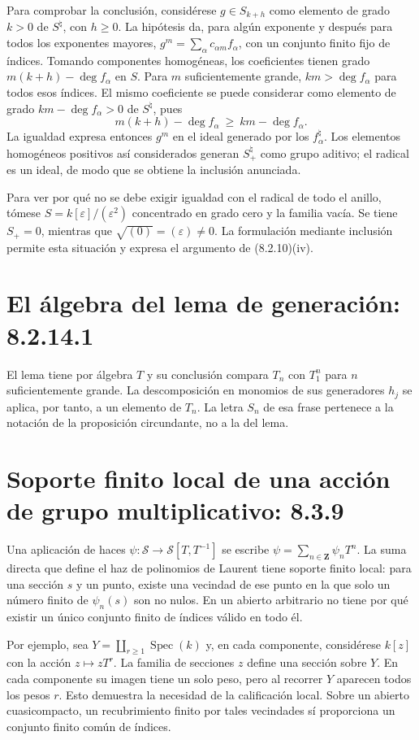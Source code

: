 \documentclass[11pt,a4paper]{article}
\DeclareMathOperator{\Spec}{Spec}
\begin{document}
Para comprobar la conclusión, considérese $g\in S_{k+h}$ como
elemento de grado $k>0$ de $S^\natural$, con $h\geq0$.
La hipótesis da, para algún exponente y después para todos los
exponentes mayores,
$g^m=\sum_\alpha c_{\alpha m}f_\alpha$, con un conjunto finito
fijo de índices. Tomando componentes homogéneas, los coeficientes
tienen grado $m(k+h)-\deg f_\alpha$ en $S$.
Para $m$ suficientemente grande, $km>\deg f_\alpha$ para todos
esos índices. El mismo coeficiente se puede considerar como
elemento de grado $km-\deg f_\alpha>0$ de $S^\natural$, pues
\[
m(k+h)-\deg f_\alpha\ \geq\ km-\deg f_\alpha.
\]
La igualdad expresa entonces $g^m$ en el ideal generado por los
$f^\natural_\alpha$. Los elementos homogéneos positivos así
considerados generan $S^\natural_+$ como grupo aditivo; el radical
es un ideal, de modo que se obtiene la inclusión anunciada.

Para ver por qué no se debe exigir igualdad con el radical de todo
el anillo, tómese $S=k[\varepsilon]/(\varepsilon^2)$ concentrado
en grado cero y la familia vacía. Se tiene $S_+=0$, mientras que
$\sqrt{(0)}=(\varepsilon)\ne0$. La formulación mediante inclusión
permite esta situación y expresa el argumento de (8.2.10)(iv).

\section{El álgebra del lema de generación: 8.2.14.1}
El lema tiene por álgebra $T$ y su conclusión compara $T_n$ con
$T_1^n$ para $n$ suficientemente grande. La descomposición en
monomios de sus generadores $h_j$ se aplica, por tanto, a un
elemento de $T_n$. La letra $S_n$ de esa frase pertenece a la
notación de la proposición circundante, no a la del lema.

\section{Soporte finito local de una acción de grupo multiplicativo: 8.3.9}
Una aplicación de haces
$\psi:\mathcal S\to\mathcal S[T,T^{-1}]$ se escribe
$\psi=\sum_{n\in\mathbf Z}\psi_nT^n$.
La suma directa que define el haz de polinomios de Laurent tiene
soporte finito local: para una sección $s$ y un punto, existe una
vecindad de ese punto en la que solo un número finito de
$\psi_n(s)$ son no nulos. En un abierto arbitrario no tiene por
qué existir un único conjunto finito de índices válido en todo él.

Por ejemplo, sea $Y=\coprod_{r\geq1}\Spec(k)$ y, en cada componente,
considérese $k[z]$ con la acción $z\mapsto zT^r$.
La familia de secciones $z$ define una sección sobre $Y$.
En cada componente su imagen tiene un solo peso, pero al recorrer
$Y$ aparecen todos los pesos $r$. Esto demuestra la necesidad de
la calificación local. Sobre un abierto cuasicompacto, un
recubrimiento finito por tales vecindades sí proporciona un conjunto
finito común de índices.
\end{document}
